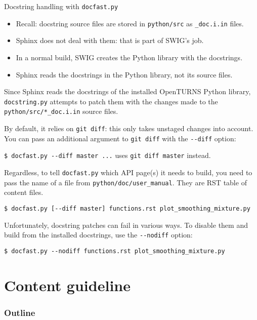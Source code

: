 \documentclass[8pt, handout]{beamer}
\begin{document}
\begin{frame}{Docstring handling with \texttt{docfast.py}}
\begin{itemize}
    \item Recall: docstring source files are stored in
    \texttt{python/\alert{src}} as \texttt{\_doc.i.in} files.
    \item \alert{Sphinx} does not deal with them: that is part of \alert{SWIG}'s job.
    \item In a normal build, SWIG creates the Python library \alert{with the docstrings}.
    \item Sphinx reads the docstrings in the Python library, \alert{not its source files}.
\end{itemize}

Since Sphinx reads the docstrings of the installed OpenTURNS Python library, \texttt{docstring.py}
attempts to \alert{patch} them with the changes made to the \texttt{python/src/*\_doc.i.in} source files.

By default, it relies on \alert{\texttt{git diff}}: this only takes unstaged changes into account. \newline
You can pass an additional argument to \texttt{git diff} with the \alert{\texttt{-{}-diff}} option:

\texttt{\$ docfast.py -{}-diff master ...} uses \texttt{git diff master} instead.

Regardless, to tell \texttt{docfast.py} which API page(s) it needs to build, you need to pass the name of a file from \texttt{python/\alert{doc}/user\_manual}. They are RST table of content files.

\texttt{\$ docfast.py [-{}-diff master] functions.rst plot\_smoothing\_mixture.py}

Unfortunately, docstring patches can fail in various ways. \newline
To disable them and build from the installed docstrings, use the \alert{\texttt{-{}-nodiff}} option:

\texttt{\$ docfast.py -{}-nodiff functions.rst plot\_smoothing\_mixture.py}
\end{frame}


\section{Content guideline}

\begin{frame}[label=tableofcontents]
\frametitle{Outline}
\tableofcontents[currentsection]
\end{frame}
\end{document}
